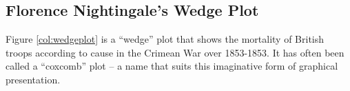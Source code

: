 \documentclass{tufte-book}\usepackage[]{graphicx}\usepackage[]{color}
\begin{document}
% 
% 

\newpage
\subsection*{Florence Nightingale's Wedge Plot}\label{sec:wedge}


Figure \ref{col:wedgeplot} is a ``wedge'' plot that shows the
mortality of British troops according to cause in the Crimean War over
1853-1853. It has often been called a ``coxcomb'' plot -- a name that
suits this imaginative form of graphical presentation.
\end{document}
